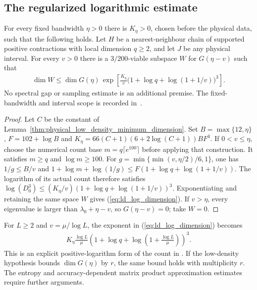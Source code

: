 \subsection{The regularized logarithmic estimate}

\begin{lemma}
    \label{cor:physical_low_density_log_dimension}
    \leanok
    For every fixed bandwidth $\eta>0$ there is $K_\eta>0$, chosen
    before the physical data, such that the following holds.
    Let $H$ be a nearest-neighbour chain of supported positive contractions
    with local dimension $q\ge2$, and let $J$ be any physical interval.
    For every $v>0$ there is a $3/200$-viable subspace $W$ for
    $G(\eta-v)$ such that
    \begin{align}
      \dim W\le\dim G(\eta)\,
      \exp\!\left[\frac{K_\eta}{v}
        \bigl(1+\log q+\log(1+1/v)\bigr)^3\right].
      \label{eq:ld_log_dimension}
    \end{align}
    No spectral gap or sampling estimate is an additional premise.
    The fixed-bandwidth and interval scope is recorded
    in~\cite{gap:alvv16_low_energy_family_scope}.
\end{lemma}
\begin{proof}\leanok
    Let $C$ be the constant of
    Lemma~\ref{thm:physical_low_density_minimum_dimension}.
    Set $B=\max\{12,\eta\}$, $F=102+\log B$ and
    $K_\eta=66(C+1)(6+2\log(C+1))BF^3$.
    If $0<v\le\eta$, choose the numerical count base
    $m=q\lceil e^{100}\rceil$ before applying that construction.
    It satisfies $m\ge q$ and $\log m\ge100$.
    For $g=\min\{\min(v,\eta/2)/6,1\}$, one has
    $1/g\le B/v$ and
    $1+\log m+\log(1/g)\le
      F(1+\log q+\log(1+1/v))$.
    The logarithm of its actual count therefore satisfies
    $\log(D_0^3)\le(K_\eta/v)(1+\log q+\log(1+1/v))^3$.
    Exponentiating and retaining the same space $W$ gives
    (\ref{eq:ld_log_dimension}).
    If $v>\eta$, every eigenvalue is larger than
    $\lambda_0+\eta-v$, so $G(\eta-v)=0$; take $W=0$.
\end{proof}

For $L\ge2$ and $v=\mu/\log L$, the exponent in
(\ref{eq:ld_log_dimension}) becomes
\begin{align*}
  K_\eta\frac{\log L}{\mu}
  \left(1+\log q+\log\!\left(1+\frac{\log L}{\mu}\right)\right)^3.
\end{align*}
This is an explicit positive-logarithm form of the count in
\cite[Proposition~prop:albootstrap-ld, lines 1107--1128]{Arad2016RigorousRG}.
If the low-density hypothesis bounds $\dim G(\eta)$ by $r$, the same
bound holds with multiplicity $r$. The entropy and accuracy-dependent
matrix product approximation estimates require further arguments.
